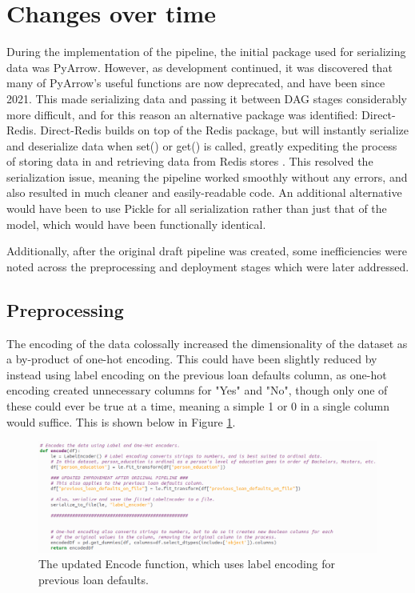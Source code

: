\documentclass[12pt]{report}
\newcommand{\para}{\vspace{7pt}\noindent}
\begin{document}
\section{Changes over time}
During the implementation of the pipeline, the initial package used for serializing data was PyArrow.
However, as development continued, it was discovered that many of PyArrow's useful functions are now 
deprecated, and have been since 2021. This made serializing data and passing it between DAG stages considerably more difficult, 
and for this reason an alternative package was identified: Direct-Redis. Direct-Redis builds on top of the Redis 
package, but will instantly serialize and deserialize data when set() or get() is called, greatly expediting 
the process of storing data in and retrieving data from Redis stores \autocite{direct-redis_direct-redis_nodate}.
This resolved the serialization issue, meaning the pipeline worked smoothly without any errors, and also 
resulted in much cleaner and easily-readable code. An additional alternative would have been to 
use Pickle for all serialization rather than just that of the model, which would have been functionally identical.

\para Additionally, after the original draft pipeline was created, some inefficiencies were noted across the preprocessing and deployment 
stages which were later addressed.

\subsection{Preprocessing}
The encoding of the data colossally increased the dimensionality of the dataset as a by-product of one-hot encoding.
This could have been slightly reduced by instead using label encoding on the previous loan defaults column, as one-hot encoding 
created unnecessary columns for "Yes" and "No", though only one of these could ever be true at a time, meaning a simple 1 or 0
in a single column would suffice. This is shown below in Figure \ref{fig:PreprocessingCode1NEW}.

\begin{figure}[H]
    \centering
    \includegraphics[width=\linewidth]{Implementation/JAN 10 UPDATES/NewEncoding.png}
    \caption{The updated Encode function, which uses label encoding for previous loan defaults.}
    \label{fig:PreprocessingCode1NEW}
\end{figure}
\end{document}
